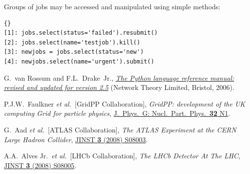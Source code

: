 \documentclass{elsart}
\def\etal {\textit{et al.}}
\begin{document}
\vspace{-2ex}

Groups of jobs may be accessed and manipulated using simple methods:

\tiny
\begin{lstlisting}[escapechar=!]{}
[1]: jobs.select(status='failed').resubmit()
[2]: jobs.select(name='testjob').kill()
[3]: newjobs = jobs.select(status='new')
[4]: newjobs.select(name='urgent').submit()
\end{lstlisting}
\normalsize

\vspace{-2ex}

\begin{thebibliography}{00}

G.~van Rossum and F.L.~Drake~Jr.,
\href{http://www.network-theory.co.uk/python/language/}
{\textit{The Python language reference manual: revised and updated for version
2.5}} (Network Theory Limited, Bristol, 2006).

P.J.W.~Faulkner \etal\ [GridPP Collaboration],
\textit{GridPP: development of the UK computing Grid for particle physics},
\href{http://dx.doi.org/10.1088/0954-3899/32/1/N01}
{J.~Phys.\ G: Nucl.\ Part.\ Phys.\ \textbf{32} N1}.

G.~Aad \etal\ [ATLAS Collaboration],
\textit{The ATLAS Experiment at the CERN Large Hadron Collider},
\href{http://dx.doi.org/10.1088/1748-0221/3/08/S08003}
{JINST {\bf 3} (2008) S08003}.


A.A.~Alves Jr.\ \etal\ [LHCb Collaboration],
\textit{The LHCb Detector At The LHC},
\href{http://dx.doi.org/10.1088/1748-0221/3/08/S08005}
{JINST {\bf 3} (2008) S08005}.



\end{thebibliography}
\end{document}
